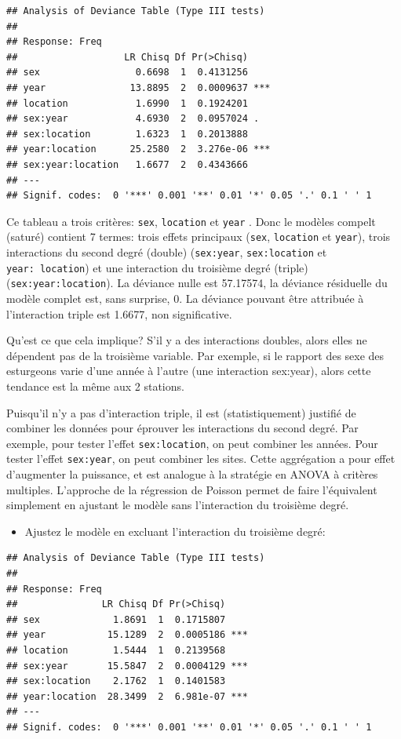 \documentclass[
  12pt,
]{book}
\providecommand{\tightlist}{%
  \setlength{\itemsep}{0pt}\setlength{\parskip}{0pt}}
\begin{document}
\begin{verbatim}
## Analysis of Deviance Table (Type III tests)
## 
## Response: Freq
##                   LR Chisq Df Pr(>Chisq)    
## sex                 0.6698  1  0.4131256    
## year               13.8895  2  0.0009637 ***
## location            1.6990  1  0.1924201    
## sex:year            4.6930  2  0.0957024 .  
## sex:location        1.6323  1  0.2013888    
## year:location      25.2580  2  3.276e-06 ***
## sex:year:location   1.6677  2  0.4343666    
## ---
## Signif. codes:  0 '***' 0.001 '**' 0.01 '*' 0.05 '.' 0.1 ' ' 1
\end{verbatim}

Ce tableau a trois critères: \texttt{sex}, \texttt{location} et \texttt{year} . Donc le modèles compelt (saturé) contient 7 termes: trois effets principaux (\texttt{sex}, \texttt{location} et \texttt{year}), trois interactions du second degré (double) (\texttt{sex:year}, \texttt{sex:location} et \texttt{year:\ location}) et une interaction du troisième degré (triple)(\texttt{sex:year:location}). La déviance nulle est 57.17574, la déviance résiduelle du modèle complet est, sans surprise, 0. La déviance pouvant être attribuée à l'interaction triple est 1.6677, non significative.

Qu'est ce que cela implique? S'il y a des interactions doubles, alors elles ne dépendent pas de la troisième variable. Par exemple, si le rapport des sexe des esturgeons varie d'une année à l'autre (une interaction sex:year), alors cette tendance est la même aux 2 stations.

Puisqu'il n'y a pas d'interaction triple, il est (statistiquement) justifié de combiner les données pour éprouver les interactions du second degré. Par exemple, pour tester l'effet \texttt{sex:location}, on peut combiner les années. Pour tester l'effet \texttt{sex:year}, on peut combiner les sites. Cette aggrégation a pour effet d'augmenter la puissance, et est analogue à la stratégie en ANOVA à critères multiples. L'approche de la régression de Poisson permet de faire l'équivalent simplement en ajustant le modèle sans l'interaction du troisième degré.

\begin{itemize}
\tightlist
\item
  Ajustez le modèle en excluant l'interaction du troisième degré:
\end{itemize}

\begin{verbatim}
## Analysis of Deviance Table (Type III tests)
## 
## Response: Freq
##               LR Chisq Df Pr(>Chisq)    
## sex             1.8691  1  0.1715807    
## year           15.1289  2  0.0005186 ***
## location        1.5444  1  0.2139568    
## sex:year       15.5847  2  0.0004129 ***
## sex:location    2.1762  1  0.1401583    
## year:location  28.3499  2  6.981e-07 ***
## ---
## Signif. codes:  0 '***' 0.001 '**' 0.01 '*' 0.05 '.' 0.1 ' ' 1
\end{verbatim}
\end{document}
